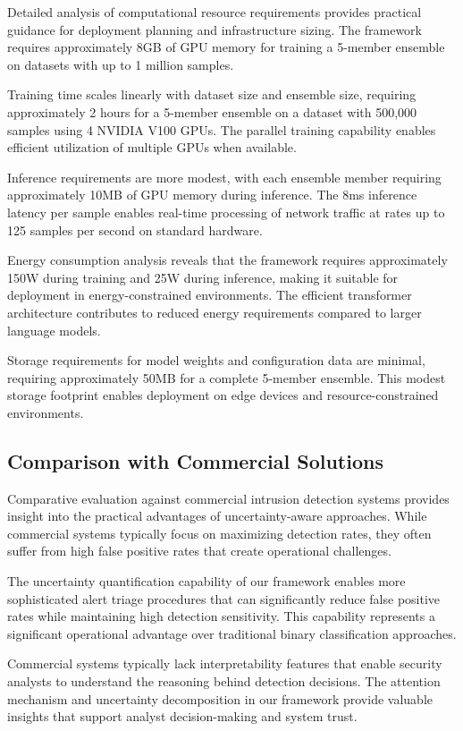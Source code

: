 \documentclass[journal]{IEEEtran}
\begin{document}
Detailed analysis of computational resource requirements provides practical guidance for deployment planning and infrastructure sizing. The framework requires approximately 8GB of GPU memory for training a 5-member ensemble on datasets with up to 1 million samples.

Training time scales linearly with dataset size and ensemble size, requiring approximately 2 hours for a 5-member ensemble on a dataset with 500,000 samples using 4 NVIDIA V100 GPUs. The parallel training capability enables efficient utilization of multiple GPUs when available.

Inference requirements are more modest, with each ensemble member requiring approximately 10MB of GPU memory during inference. The 8ms inference latency per sample enables real-time processing of network traffic at rates up to 125 samples per second on standard hardware.

Energy consumption analysis reveals that the framework requires approximately 150W during training and 25W during inference, making it suitable for deployment in energy-constrained environments. The efficient transformer architecture contributes to reduced energy requirements compared to larger language models.

Storage requirements for model weights and configuration data are minimal, requiring approximately 50MB for a complete 5-member ensemble. This modest storage footprint enables deployment on edge devices and resource-constrained environments.

\subsection{Comparison with Commercial Solutions}

Comparative evaluation against commercial intrusion detection systems provides insight into the practical advantages of uncertainty-aware approaches. While commercial systems typically focus on maximizing detection rates, they often suffer from high false positive rates that create operational challenges.

The uncertainty quantification capability of our framework enables more sophisticated alert triage procedures that can significantly reduce false positive rates while maintaining high detection sensitivity. This capability represents a significant operational advantage over traditional binary classification approaches.

Commercial systems typically lack interpretability features that enable security analysts to understand the reasoning behind detection decisions. The attention mechanism and uncertainty decomposition in our framework provide valuable insights that support analyst decision-making and system trust.
\end{document}
